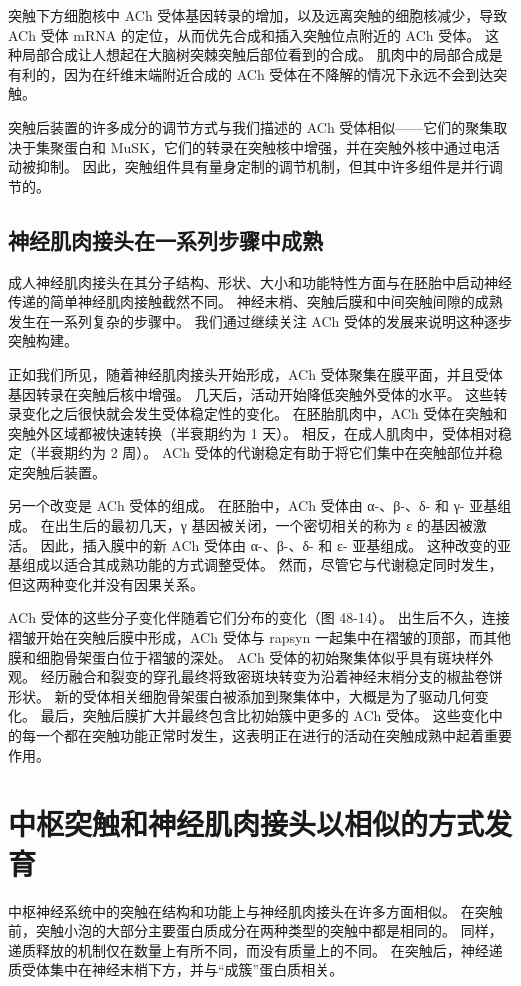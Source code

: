 突触下方细胞核中 ACh 受体基因转录的增加，以及远离突触的细胞核减少，导致 ACh 受体 mRNA 的定位，从而优先合成和插入突触位点附近的 ACh 受体。 这种局部合成让人想起在大脑树突棘突触后部位看到的合成。 肌肉中的局部合成是有利的，因为在纤维末端附近合成的 ACh 受体在不降解的情况下永远不会到达突触。

突触后装置的许多成分的调节方式与我们描述的 ACh 受体相似——它们的聚集取决于集聚蛋白和 MuSK，它们的转录在突触核中增强，并在突触外核中通过电活动被抑制。 因此，突触组件具有量身定制的调节机制，但其中许多组件是并行调节的。

\subsection{神经肌肉接头在一系列步骤中成熟}
成人神经肌肉接头在其分子结构、形状、大小和功能特性方面与在胚胎中启动神经传递的简单神经肌肉接触截然不同。 神经末梢、突触后膜和中间突触间隙的成熟发生在一系列复杂的步骤中。 我们通过继续关注 ACh 受体的发展来说明这种逐步突触构建。

正如我们所见，随着神经肌肉接头开始形成，ACh 受体聚集在膜平面，并且受体基因转录在突触后核中增强。 几天后，活动开始降低突触外受体的水平。 这些转录变化之后很快就会发生受体稳定性的变化。 在胚胎肌肉中，ACh 受体在突触和突触外区域都被快速转换（半衰期约为 1 天）。 相反，在成人肌肉中，受体相对稳定（半衰期约为 2 周）。 ACh 受体的代谢稳定有助于将它们集中在突触部位并稳定突触后装置。

另一个改变是 ACh 受体的组成。 在胚胎中，ACh 受体由 α-、β-、δ- 和 γ- 亚基组成。 在出生后的最初几天，γ 基因被关闭，一个密切相关的称为 ε 的基因被激活。 因此，插入膜中的新 ACh 受体由 α-、β-、δ- 和 ε- 亚基组成。 这种改变的亚基组成以适合其成熟功能的方式调整受体。 然而，尽管它与代谢稳定同时发生，但这两种变化并没有因果关系。

ACh 受体的这些分子变化伴随着它们分布的变化（图 48-14）。 出生后不久，连接褶皱开始在突触后膜中形成，ACh 受体与 rapsyn 一起集中在褶皱的顶部，而其他膜和细胞骨架蛋白位于褶皱的深处。 ACh 受体的初始聚集体似乎具有斑块样外观。 经历融合和裂变的穿孔最终将致密斑块转变为沿着神经末梢分支的椒盐卷饼形状。 新的受体相关细胞骨架蛋白被添加到聚集体中，大概是为了驱动几何变化。 最后，突触后膜扩大并最终包含比初始簇中更多的 ACh 受体。 这些变化中的每一个都在突触功能正常时发生，这表明正在进行的活动在突触成熟中起着重要作用。


\section{中枢突触和神经肌肉接头以相似的方式发育}
中枢神经系统中的突触在结构和功能上与神经肌肉接头在许多方面相似。 在突触前，突触小泡的大部分主要蛋白质成分在两种类型的突触中都是相同的。 同样，递质释放的机制仅在数量上有所不同，而没有质量上的不同。 在突触后，神经递质受体集中在神经末梢下方，并与“成簇”蛋白质相关。

